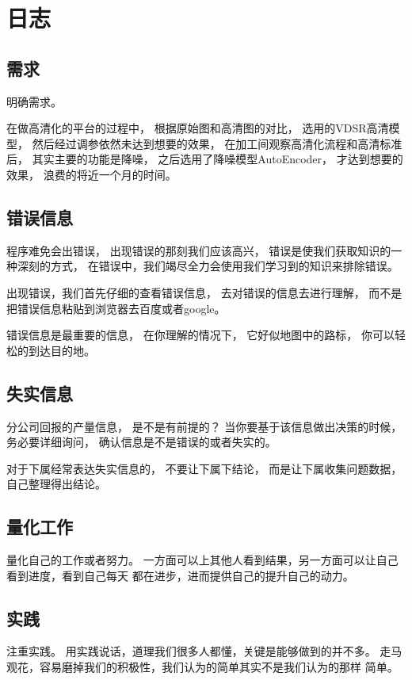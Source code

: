 
\chapter{日志}

\section{需求}

明确需求。

在做高清化的平台的过程中，
根据原始图和高清图的对比，
选用的VDSR高清模型，
然后经过调参依然未达到想要的效果，
在加工间观察高清化流程和高清标准后，
其实主要的功能是降噪，
之后选用了降噪模型AutoEncoder，
才达到想要的效果，
浪费的将近一个月的时间。



\section{错误信息}

程序难免会出错误，
出现错误的那刻我们应该高兴，
错误是使我们获取知识的一种深刻的方式，
在错误中，我们竭尽全力会使用我们学习到的知识来排除错误。

出现错误，我们首先仔细的查看错误信息，
去对错误的信息去进行理解，
而不是把错误信息粘贴到浏览器去百度或者google。

错误信息是最重要的信息，
在你理解的情况下，
它好似地图中的路标，
你可以轻松的到达目的地。



\section{失实信息}

分公司回报的产量信息，
是不是有前提的？
当你要基于该信息做出决策的时候，
务必要详细询问，
确认信息是不是错误的或者失实的。


对于下属经常表达失实信息的，
不要让下属下结论，
而是让下属收集问题数据，
自己整理得出结论。


\section{量化工作}

量化自己的工作或者努力。
一方面可以上其他人看到结果，另一方面可以让自己看到进度，看到自己每天
都在进步，进而提供自己的提升自己的动力。


\section{实践}
注重实践。
用实践说话，道理我们很多人都懂，关键是能够做到的并不多。
走马观花，容易磨掉我们的积极性，我们认为的简单其实不是我们认为的那样
简单。






